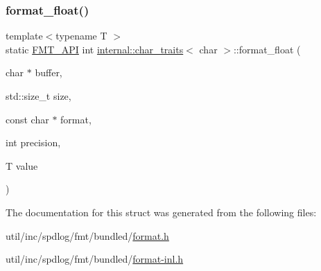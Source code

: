 \subsubsection{\texorpdfstring{format\+\_\+float()}{format\_float()}\hspace{0.1cm}{\footnotesize\ttfamily [2/2]}}
{\footnotesize\ttfamily template$<$typename T $>$ \\
static \hyperlink{core_8h_a9a4960b70582ed2620911a0b75dce0b5}{F\+M\+T\+\_\+\+A\+PI} int \hyperlink{structinternal_1_1char__traits}{internal\+::char\+\_\+traits}$<$ char $>$\+::format\+\_\+float (\begin{DoxyParamCaption}\item[{char $\ast$}]{buffer,  }\item[{std\+::size\+\_\+t}]{size,  }\item[{const char $\ast$}]{format,  }\item[{int}]{precision,  }\item[{T}]{value }\end{DoxyParamCaption})\hspace{0.3cm}{\ttfamily [static]}}



The documentation for this struct was generated from the following files\+:\begin{DoxyCompactItemize}
\item 
util/inc/spdlog/fmt/bundled/\hyperlink{format_8h}{format.\+h}\item 
util/inc/spdlog/fmt/bundled/\hyperlink{format-inl_8h}{format-\/inl.\+h}\end{DoxyCompactItemize}
